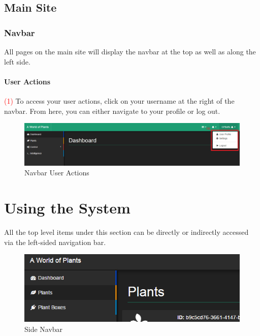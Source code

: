 \documentclass{article}
\begin{document}
\subsection{Main Site}
	\subsubsection{Navbar}
	All pages on the main site will display the navbar at the top as well as along the left side.
		\paragraph{User Actions}
		\textcolor{red}{(1)} To access your user actions, click on your username at the right of the navbar. From here, you can either navigate to your profile or log out.
		\begin{figure}[H]
			\includegraphics[width=\textwidth]{../images/UserManual/navbar-user-actions.PNG}
			\caption{Navbar User Actions}
		\end{figure}

\cleardoublepage

\section{Using the System}
	All the top level items under this section can be directly or indirectly accessed via the left-sided navigation bar.
	
	\begin{figure}[H]
		\includegraphics[width=\textwidth]{../images/UserManual/side-navbar.png}
		\caption{Side Navbar}
	\end{figure}	
	
\end{document}
